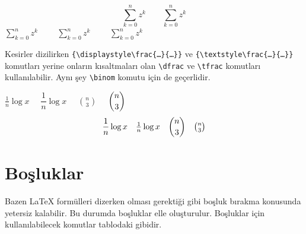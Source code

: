 \documentclass[
  10pt,
]{scrbook}
\newenvironment{Shaded}{\begin{snugshade}}{\end{snugshade}}
\newcommand{\FunctionTok}[1]{\textcolor[rgb]{0.00,0.00,0.00}{#1}}
\newcommand{\SpecialCharTok}[1]{\textcolor[rgb]{0.00,0.00,0.00}{#1}}
\newcommand{\SpecialStringTok}[1]{\textcolor[rgb]{0.31,0.60,0.02}{#1}}
\theoremstyle{definition}
\theoremstyle{definition}
\theoremstyle{definition}
\theoremstyle{definition}
\theoremstyle{remark}
\begin{document}
\[
\sum_{k=0}^n z^k \qquad \textstyle\sum_{k=0}^n z^k
\] \(\displaystyle\sum_{k=0}^n z^k\qquad\) \(\sum_{k=0}^n z^k\qquad\) \(\scriptstyle\sum_{k=0}^n z^k\)

Kesirler dizilirken \texttt{\{\textbackslash{}displaystyle\textbackslash{}frac\{…\}\{…\}\}} ve \texttt{\{\textbackslash{}textstyle\textbackslash{}frac\{…\}\{…\}\}} komutları yerine onların kısaltmaları olan \texttt{\textbackslash{}dfrac} ve \texttt{\textbackslash{}tfrac} komutları kullanılabilir. Aynı şey \texttt{\textbackslash{}binom} komutu için de geçerlidir.

\begin{Shaded}
\end{Shaded}

\(\frac{1}{n}\log x\quad\) \(\dfrac{1}{n}\log x\quad\) \(\binom{n}{3}\quad\) \(\dbinom{n}{3}\) \[
\frac{1}{n}\log x \quad
\tfrac{1}{n}\log x \quad
\binom{n}{3} \quad
\tbinom{n}{3}
\]

\hypertarget{boux15fluklar}{%
\section{Boşluklar}\label{boux15fluklar}}

Bazen LaTeX formülleri dizerken olması gerektiği gibi boşluk bırakma konusunda yetersiz kalabilir. Bu durumda boşluklar elle oluşturulur. Boşluklar için kullanılabilecek komutlar tablodaki gibidir.
\end{document}
